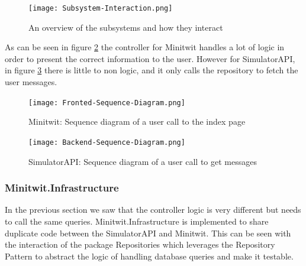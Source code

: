 \begin{figure}[H]
    \begin{center}
        \texttt{[image: Subsystem-Interaction.png]}
    \end{center}
    \caption{An overview of the subsystems and how they interact}
    \label{fig:subsystem-interaction}
\end{figure}

As can be seen in figure \ref{fig:frontend-interaction} the controller for Minitwit handles a lot of logic in order to present the correct information to the user. However for SimulatorAPI, in figure \ref{fig:backend-interaction} there is little to non logic, and it only calls the repository to fetch the user messages.
\begin{figure}[H]
    \begin{center}
        \texttt{[image: Fronted-Sequence-Diagram.png]}
    \end{center}
    \caption{Minitwit: Sequence diagram of a user call to the index page}
    \label{fig:frontend-interaction}
\end{figure}
\begin{figure}[H]
    \begin{center}
        \texttt{[image: Backend-Sequence-Diagram.png]}
    \end{center}
    \caption{SimulatorAPI: Sequence diagram of a user call to get messages}
    \label{fig:backend-interaction}
\end{figure}
\subsubsection{Minitwit.Infrastructure}
In the previous section we saw that the controller logic is very different but needs to call the same queries.
Minitwit.Infrastructure is implemented to share duplicate code between the SimulatorAPI and Minitwit. This can be seen with the interaction of the package Repositories which leverages the Repository Pattern to abstract the logic of handling database queries and make it testable.


